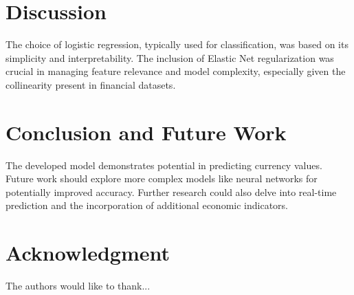 \documentclass[conference]{IEEEtran}
\begin{document}
\section{Discussion}
The choice of logistic regression, typically used for classification, was based on its simplicity and interpretability. The inclusion of Elastic Net regularization was crucial in managing feature relevance and model complexity, especially given the collinearity present in financial datasets.

\section{Conclusion and Future Work}
The developed model demonstrates potential in predicting currency values. Future work should explore more complex models like neural networks for potentially improved accuracy. Further research could also delve into real-time prediction and the incorporation of additional economic indicators.

\section*{Acknowledgment}
The authors would like to thank...



\end{document}
